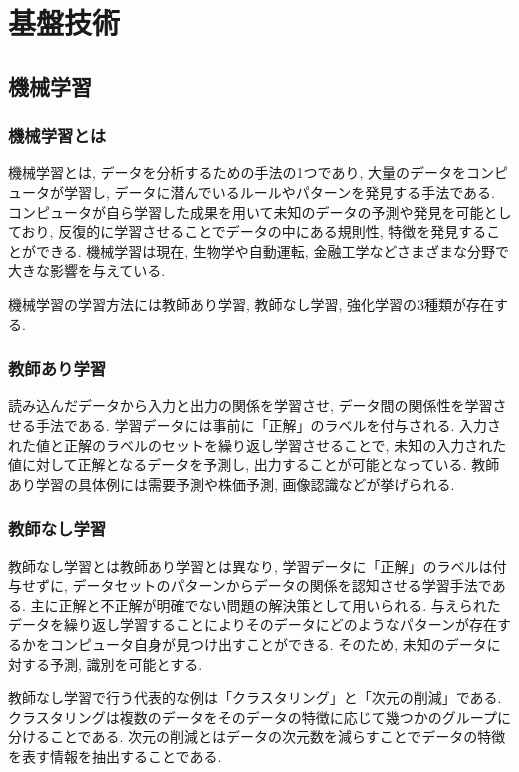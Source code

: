 \chapter{基盤技術}
\label{chap:kibangijyutu}



\section{機械学習}
\subsection{機械学習とは}
機械学習とは, データを分析するための手法の1つであり, 大量のデータをコンピュータが学習し, データに潜んでいるルールやパターンを発見する手法である. コンピュータが自ら学習した成果を用いて未知のデータの予測や発見を可能としており, 反復的に学習させることでデータの中にある規則性, 特徴を発見することができる. 機械学習は現在, 生物学や自動運転, 金融工学などさまざまな分野で大きな影響を与えている. 

機械学習の学習方法には教師あり学習, 教師なし学習, 強化学習の3種類が存在する. 

\subsection{教師あり学習}
読み込んだデータから入力と出力の関係を学習させ, データ間の関係性を学習させる手法である. 学習データには事前に「正解」のラベルを付与される. 
入力された値と正解のラベルのセットを繰り返し学習させることで, 未知の入力された値に対して正解となるデータを予測し, 出力することが可能となっている. 
教師あり学習の具体例には需要予測や株価予測, 画像認識などが挙げられる. 

\subsection{教師なし学習}
教師なし学習とは教師あり学習とは異なり, 学習データに「正解」のラベルは付与せずに, データセットのパターンからデータの関係を認知させる学習手法である. 主に正解と不正解が明確でない問題の解決策として用いられる. 
与えられたデータを繰り返し学習することによりそのデータにどのようなパターンが存在するかをコンピュータ自身が見つけ出すことができる. そのため, 未知のデータに対する予測, 識別を可能とする. 

教師なし学習で行う代表的な例は「クラスタリング」と「次元の削減」である. クラスタリングは複数のデータをそのデータの特徴に応じて幾つかのグループに分けることである. 次元の削減とはデータの次元数を減らすことでデータの特徴を表す情報を抽出することである. 

